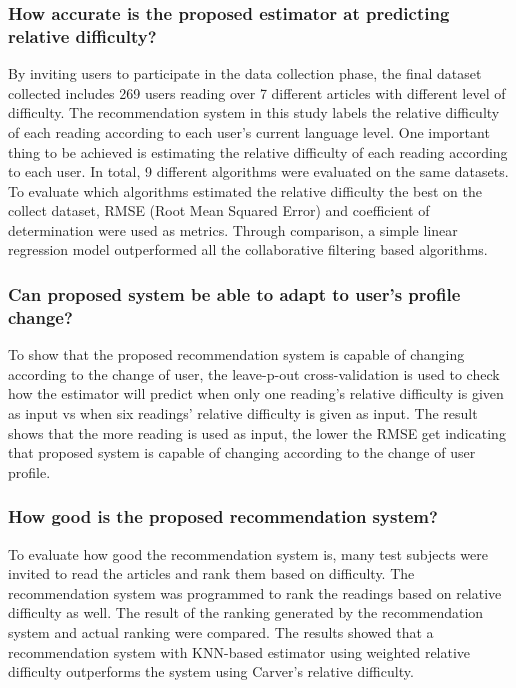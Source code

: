 \subsubsection{How accurate is the proposed estimator at predicting relative difficulty?}
\vspace{10pt}

By inviting users to participate in the data collection phase, the final dataset collected includes 269 users reading over 7 different articles with different level of difficulty. The recommendation system in this study labels the relative difficulty of each reading according to each user's current language level. One important thing to be achieved is estimating the relative difficulty of each reading according to each user. In total, 9 different algorithms were evaluated on the same datasets. To evaluate which algorithms estimated the relative difficulty the best on the collect dataset, RMSE (Root Mean Squared Error) and coefficient of determination were used as metrics. Through comparison, a simple linear regression model outperformed all the collaborative filtering based algorithms. 

\subsubsection{Can proposed system be able to adapt to user's profile change?}
\vspace{10pt}

To show that the proposed recommendation system is capable of changing according to the change of user, the leave-p-out cross-validation \cite{Kohavi1995} is used to check how the estimator will predict when only one reading's relative difficulty is given as input vs when six readings' relative difficulty is given as input. The result shows that the more reading is used as input, the lower the RMSE get indicating that proposed system is capable of changing according to the change of user profile. 

\subsubsection{How good is the proposed recommendation system?}
\vspace{10pt}

To evaluate how good the recommendation system is, many test subjects were invited to read the articles and rank them based on difficulty. The recommendation system was programmed to rank the readings based on relative difficulty as well. The result of the ranking generated by the recommendation system and actual ranking were compared. The results showed that a recommendation system with KNN-based estimator using weighted relative difficulty outperforms the system using Carver's relative difficulty.

